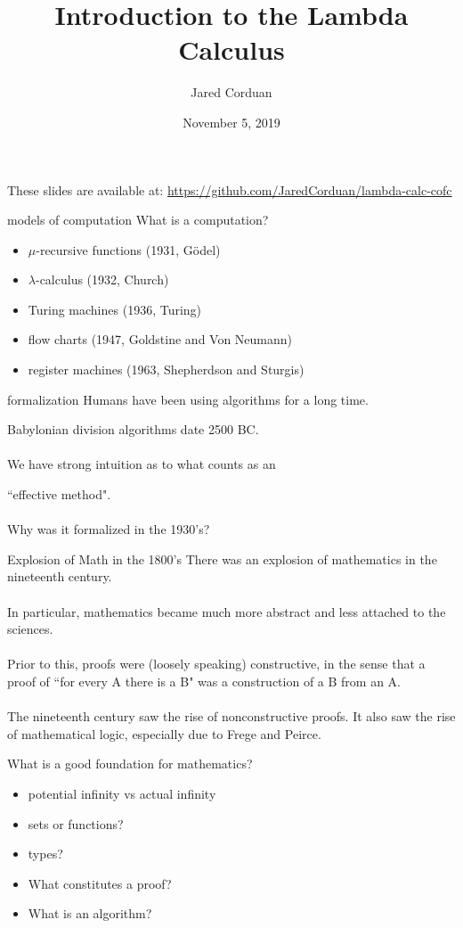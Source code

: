 \documentclass{beamer}
\title[Introduction to the Lambda Calculus]{Introduction to the Lambda Calculus}
\author[]{Jared Corduan}
\date{November 5, 2019}
\newcommand{\vs}{\\~\\}
\begin{document}
\begin{frame}
  \titlepage
\end{frame}

\begin{frame}
  These slides are available at:
  \url{https://github.com/JaredCorduan/lambda-calc-cofc}
\end{frame}

\begin{frame}{models of computation}
  What is a computation?

  \begin{itemize}
    \item $\mu$-recursive functions (1931, G\"odel)
    \item $\lambda$-calculus (1932, Church)
    \item Turing machines (1936, Turing)
    \item flow charts (1947, Goldstine and Von Neumann)
    \item register machines (1963, Shepherdson and Sturgis)
  \end{itemize}
\end{frame}

\begin{frame}{formalization}
  Humans have been using algorithms for a long time.

  Babylonian division algorithms date 2500 BC.
  \vs
  We have strong intuition as to what counts as an

  ``effective method".
  \vs
  Why was it formalized in the 1930's?
\end{frame}

\begin{frame}{Explosion of Math in the 1800's}
  There was an explosion of mathematics in the nineteenth century.
  \vs
  In particular, mathematics became much more abstract and less attached to the sciences.
  \vs
  Prior to this, proofs were (loosely speaking) constructive, in the sense that a proof of
  ``for every A there is a B" was a construction of a B from an A.
  \vs
  The nineteenth century saw the rise of nonconstructive proofs.
  It also saw the rise of mathematical logic, especially due to Frege and Peirce.
\end{frame}

\begin{frame}{What is a good foundation for mathematics?}
  \begin{itemize}
    \item potential infinity vs actual infinity
    \item sets or functions?
    \item types?
    \item What constitutes a proof?
    \item What is an algorithm?
  \end{itemize}
\end{frame}
\end{document}
